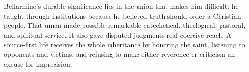 Bellarmine's durable significance lies in the union that makes him difficult:
he taught through institutions because he believed truth should order a
Christian people.  That union made possible remarkable catechetical,
theological, pastoral, and spiritual service.  It also gave disputed judgments
real coercive reach.  A source-first life receives the whole inheritance by
honoring the saint, listening to opponents and victims, and refusing to make
either reverence or criticism an excuse for imprecision.
